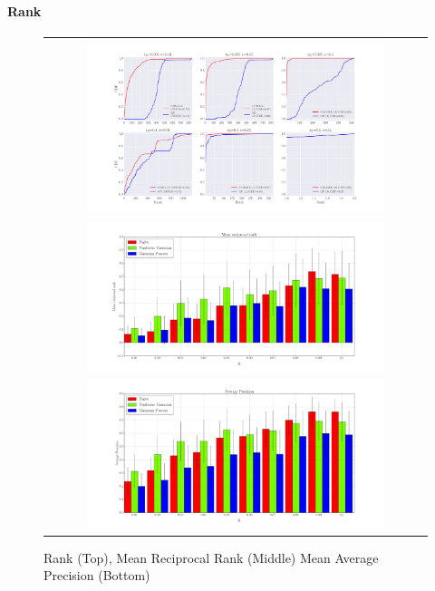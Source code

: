 \paragraph{Rank}
\begin{figure}[H]
  \centering
    \begin{tabular}{c}
        \includegraphics[width=0.8\textwidth]{rank}\\
  		    \includegraphics[width=0.8\textwidth]{mrr}\\
  		        \includegraphics[width=0.8\textwidth]{ap}
  \end{tabular}
  \caption{Rank (Top), Mean Reciprocal Rank (Middle) Mean Average Precision (Bottom)}
  \label{fig:rank}
\end{figure}



